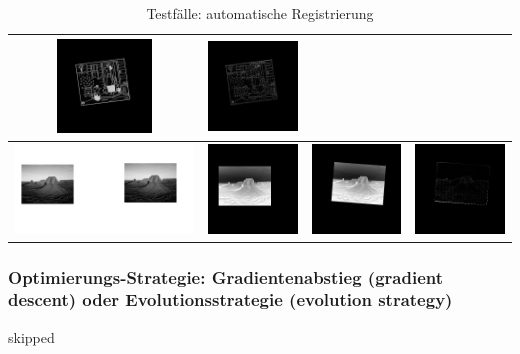\documentclass[12pt,german]{article}
\begin{document}
\begin{table}[H]
\begin{tabular}{| c | c | c | c |}
    \includegraphics[width=2.5cm]{images/autoregister/binary2SH.jpg} &
    \includegraphics[width=2.5cm]{images/autoregister/binary2DIFF.jpg} \\
    \hline
    \includegraphics[width=5cm]{images/autoregister/gray2.jpg} &
    \includegraphics[width=2.5cm]{images/autoregister/gray1FH.jpg} &
    \includegraphics[width=2.5cm]{images/autoregister/gray1SH.jpg} &
    \includegraphics[width=2.5cm]{images/autoregister/gray1DIFF.jpg} \\
    \hline
    
  \end{tabular}
  \caption{Testfälle: automatische Registrierung}
  \label{tab:autoRegisterTest}
\end{table}

\subsubsection{Optimierungs-Strategie: Gradientenabstieg (gradient descent) oder Evolutionsstrategie (evolution strategy)}
skipped\\
\end{document}
